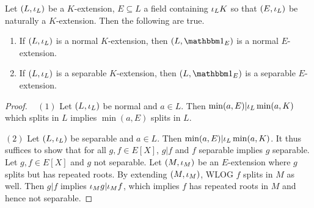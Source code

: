 \documentclass[main.tex]{subfiles}
\begin{document}
\begin{lem}
  
  Let $(L,\iota_L)$ be a $K$-extension, $E \subseteq L$ a field containing $\iota_L K$
  so that $(E,\iota_L)$ be naturally a $K$-extension. 
  Then the following are true.  
  \begin{enumerate}
    \item If $(L,\iota_L)$ is a normal $K$-extension, 
    then $(L,\id{E})$ is a normal $E$-extension. 
    \item If $(L,\iota_L)$ is a separable $K$-extension, 
    then $(L,\id{E})$ is a separable $E$-extension. 
  \end{enumerate}
\end{lem}
\begin{proof}~
  $(1)$ Let $(L,\iota_L)$ be normal and $a \in L$. 
  Then $\min(a,E) | \iota_L \min(a,K)$ which splits in $L$ implies 
  $\min(a,E)$ splits in $L$. 

  $(2)$ Let $(L,\iota_L)$ be separable and $a \in L$. 
  Then $\min(a,E) | \iota_L \min(a,K)$. 
  It thus suffices to show that for all $g, f \in E[X]$, 
  $g | f$ and $f$ separable implies $g$ separable. 
  Let $g, f \in E[X]$ and $g$ not separable. 
  Let $(M,\iota_M)$ be an $E$-extension where $g$ splits but has repeated roots. 
  By extending $(M,\iota_M)$, WLOG $f$ splits in $M$ as well. 
  Then $g | f$ implies $\iota_M g | \iota_M f$, 
  which implies $f$ has repeated roots in $M$ and hence not separable. 
\end{proof}
\end{document}
